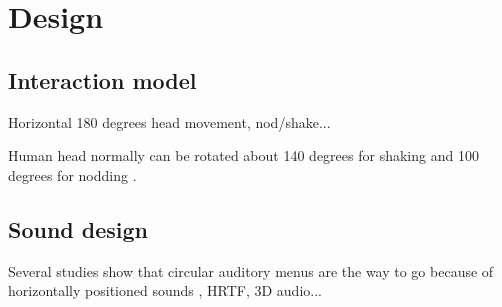 \chapter{Design}


\section{Interaction model}
Horizontal 180 degrees head movement, nod/shake...

Human head normally can be rotated about 140 degrees for shaking and 100 degrees for nodding \cite{lopresti_neck_2000}.



\section{Sound design}
Several studies show that circular auditory menus are the way to go because of horizontally positioned sounds , HRTF, 3D audio...



